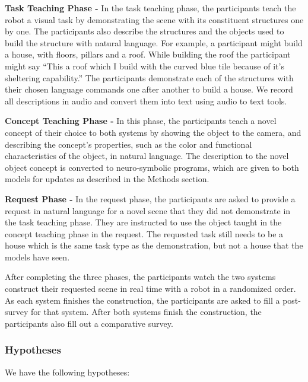 
\noindent\textbf{Task Teaching Phase - } In the task teaching phase, the participants teach the robot a visual task by demonstrating the scene with its constituent structures one by one. The participants also describe the structures and the objects used to build the structure with natural language. For example, a participant might build a house, with floors, pillars and a roof. While building the roof the participant might say ``This a roof which I build with the curved blue tile because of it's sheltering capability.'' The participants demonstrate each of the structures with their chosen language commands one after another to build a house. We record all descriptions in audio and convert them into text using audio to text tools.  

\noindent\textbf{Concept Teaching Phase - } In this phase, the participants teach a novel concept of their choice to both systems by showing the object to the camera, and describing the concept's properties, such as the color and functional characteristics of the object, in natural language. 
The description to the novel object concept is converted to neuro-symbolic programs, which are given to both models for updates as described in the Methods section. 


\noindent\textbf{Request Phase - } In the request phase, the participants are asked to provide a request in natural language for a novel scene that they did not demonstrate in the task teaching phase. They are instructed to use the object taught in the concept teaching phase in the request. The requested task still needs to be a house which is the same task type as the demonstration, but not a house that the models have seen.


After completing the three phases, the participants watch the two systems construct their requested scene in real time with a robot in a randomized order. As each system finishes the construction, the participants are asked to fill a post-survey for that system. After both systems finish the construction, the participants also fill out a comparative survey.


\subsubsection{Hypotheses}
We have the following hypotheses:


